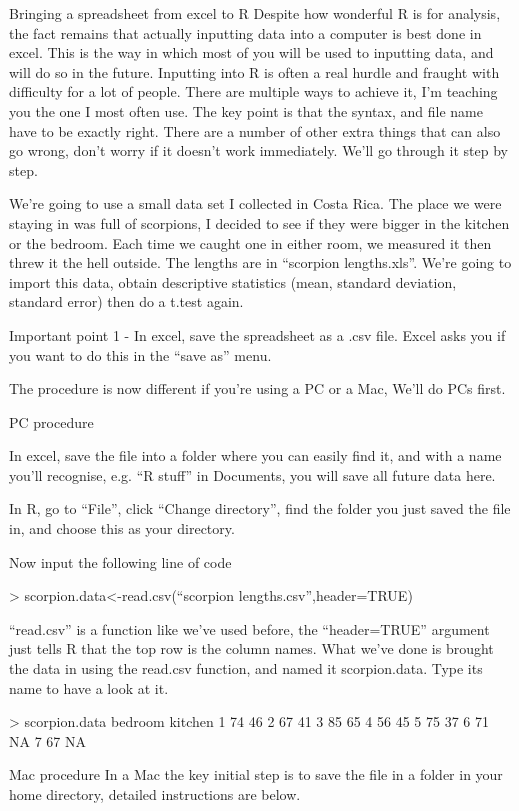\documentclass{article}
\begin{document}
Bringing a spreadsheet from excel to R
Despite how wonderful R is for analysis, the fact remains that actually inputting data into a computer is best done in excel. This is the way in which most of you will be used to inputting data, and will do so in the future.  Inputting into R is often a real hurdle and fraught with difficulty for a lot of people. There are multiple ways to achieve it, I’m teaching you the one I most often use. The key point is that the syntax, and file name have to be exactly right.  There are a number of other extra things that can also go wrong, don’t worry if it doesn’t work immediately. We’ll go through it step by step. 

We’re going to use a small data set I collected in Costa Rica. The place we were staying in was full of scorpions, I decided to see if they were bigger in the kitchen or the bedroom. Each time we caught one in either room, we measured it then threw it the hell outside. The lengths are in “scorpion lengths.xls”. We’re going to import this data, obtain descriptive statistics (mean, standard deviation, standard error) then do a t.test again. 

Important point 1 - In excel, save the spreadsheet as a .csv file. Excel asks you if you want to do this in the “save as” menu. 

The procedure is now different if you’re using a PC or a Mac, We’ll do PCs first. 

PC procedure

In excel, save the file into a folder where you can easily find it, and with a name you’ll recognise, e.g. “R stuff” in Documents, you will save all future data here.

In R, go to “File”, click “Change directory”, find the folder you just saved the file in, and choose this as your directory. 

Now input the following line of code

> scorpion.data<-read.csv(“scorpion lengths.csv”,header=TRUE)

“read.csv” is a function like we’ve used before, the “header=TRUE” argument just tells R that the top row is the column names.  What we’ve done is brought the data in using the read.csv function, and named it scorpion.data. Type its name to have a look at it.

> scorpion.data
   bedroom kitchen
1      74      46
2      67      41
3      85      65
4      56      45
5      75      37
6      71      NA
7      67      NA


Mac procedure
In a Mac the key initial step is to save the file in a folder in your home directory, detailed instructions are below. 
\end{document}
